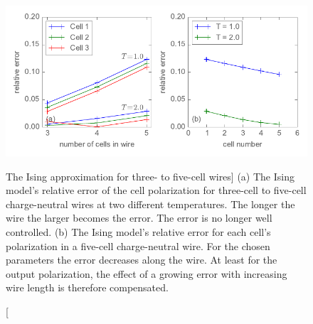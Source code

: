 \begin{figure}
  \center
  \includegraphics{ising_approximation3}
  \caption
  [The Ising approximation for three- to five-cell wires]
  {
  (a) The Ising model's relative error of the cell polarization for three-cell
  to five-cell charge-neutral wires at two different temperatures. The longer
  the wire the larger becomes the error. The error is no longer well controlled.
  (b) The Ising model's relative error for each cell's polarization in a
  five-cell charge-neutral wire. For the chosen parameters the error decreases
  along the wire. At least for the output polarization, the effect of a growing
  error with increasing wire length is therefore compensated.
  }
  \label{fig:ising_approximation3}
\end{figure}
%

